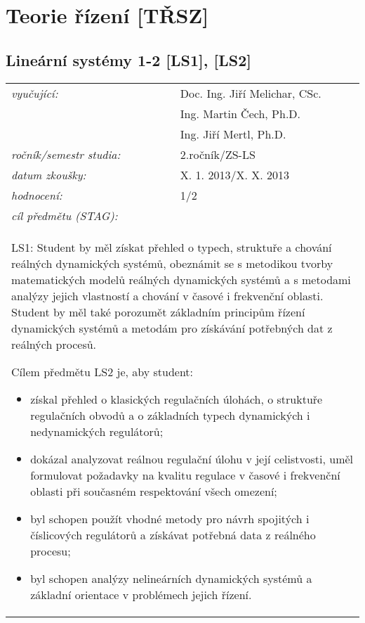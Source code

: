 \chapter{Teorie řízení [TŘSZ]}

\section{Lineární systémy 1-2 [LS1], [LS2]}

\begin{table}[H]
\centering
\begin{tabular}{p{4cm} p{12cm}}
\textit{vyučující:}             & Doc. Ing. Jiří Melichar, CSc. \\
								 & Ing. Martin Čech, Ph.D. \\
								 & Ing. Jiří Mertl, Ph.D. \\
\textit{ročník/semestr studia:} & 2.ročník/ZS-LS \\
\textit{datum zkoušky:}         & X. 1. 2013/X. X. 2013 \\
\textit{hodnocení:}             & 1/2 \\
\textit{cíl předmětu (STAG):}   & \\
\multicolumn{2}{p{16cm}}{LS1: Student by měl získat přehled o typech, struktuře a chování reálných dynamických systémů, obeznámit se s metodikou tvorby matematických modelů reálných dynamických systémů a s metodami analýzy jejich vlastností a chování v časové i frekvenční oblasti. Student by měl také porozumět základním principům řízení dynamických systémů a metodám pro získávání potřebných dat z reálných procesů. 

Cílem předmětu LS2 je, aby student:
\begin{itemize}
\item získal přehled o klasických regulačních úlohách, o struktuře regulačních obvodů a o základních typech dynamických i nedynamických regulátorů;
\item dokázal analyzovat reálnou regulační úlohu v její celistvosti, uměl formulovat požadavky na kvalitu regulace v časové i frekvenční oblasti při současném respektování všech omezení;
\item byl schopen použít vhodné metody pro návrh spojitých i číslicových regulátorů a získávat potřebná data z reálného procesu;
\item byl schopen analýzy nelineárních dynamických systémů a základní orientace v problémech jejich řízení.
\end{itemize}}
\end{tabular}
\end{table}

